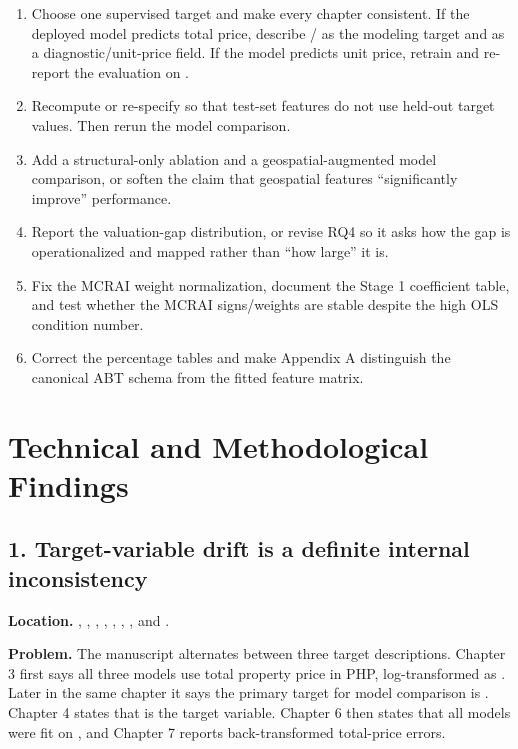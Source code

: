 \documentclass[11pt]{article}
\begin{document}
\begin{enumerate}
\item Choose one supervised target and make every chapter consistent. If the deployed model predicts total price, describe / as the modeling target and  as a diagnostic/unit-price field. If the model predicts unit price, retrain and re-report the evaluation on .
\item Recompute or re-specify  so that test-set features do not use held-out target values. Then rerun the model comparison.
\item Add a structural-only ablation and a geospatial-augmented model comparison, or soften the claim that geospatial features ``significantly improve'' performance.
\item Report the valuation-gap distribution, or revise RQ4 so it asks how the gap is operationalized and mapped rather than ``how large'' it is.
\item Fix the MCRAI weight normalization, document the Stage 1 coefficient table, and test whether the MCRAI signs/weights are stable despite the high OLS condition number.
\item Correct the percentage tables and make Appendix A distinguish the canonical ABT schema from the fitted feature matrix.
\end{enumerate}

\section*{Technical and Methodological Findings}

\subsection*{1. Target-variable drift is a definite internal inconsistency}

\textbf{Location.} , , , , , , , and .

\textbf{Problem.} The manuscript alternates between three target descriptions. Chapter 3 first says all three models use total property price in PHP, log-transformed as . Later in the same chapter it says the primary target for model comparison is . Chapter 4 states that  is the target variable. Chapter 6 then states that all models were fit on , and Chapter 7 reports back-transformed total-price errors.
\end{document}
